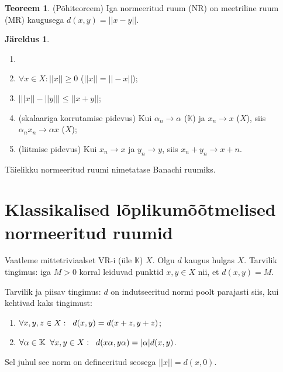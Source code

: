 \documentclass{article}[12pt]
\newcommand{\h}{\hspace{0.2cm}}
\newcommand{\K}{\mathbb{K}}
\newcommand{\norm}[1]{||#1||}
\theoremstyle{definition}
\theoremstyle{definition}
\newtheorem{theorem}{Teoreem}[section]
\theoremstyle{definition}
\newtheorem{jareldus}{Järeldus}[section]
\theoremstyle{break}
\begin{document}
\begin{theorem}
	(Põhiteoreem) Iga normeeritud ruum (NR) on meetriline ruum (MR) kaugusega $d(x,y) = ||x-y||$.
\end{theorem}

\begin{jareldus}
	\begin{enumerate}
		\item[]
		\item $\forall x\in X: \norm{x} \geq 0$ ($\norm{x} = \norm{-x}$);
		\item $\bigg\lvert \norm{x} - \norm{y} \bigg\rvert \leq \norm{x+y}$;
		\item (skalaariga korrutamise pidevus) Kui $\alpha_n\rightarrow \alpha$ ($\K$) ja $x_n\rightarrow x$ ($X$), siis $\alpha_n x_n\rightarrow \alpha x$ ($X$);
		\item (liitmise pidevus) Kui $x_n\rightarrow x$ ja $y_n\rightarrow y$, siis $x_n+y_n \rightarrow x+n$.
	\end{enumerate}
\end{jareldus}

Täielikku normeeritud ruumi nimetatase Banachi ruumiks.

\section{Klassikalised lõplikumõõtmelised normeeritud ruumid}

Vaatleme mittetriviaalset VR-i (üle $\K$) $X$. Olgu $d$ kaugus hulgas $X$.
Tarvilik tingimus: iga $M>0$ korral leiduvad punktid $x,y\in X$ nii, et $d(x,y) = M$.

Tarvilik ja piisav tingimus: $d$ on indutseeritud normi poolt parajasti siis, kui kehtivad kaks tingimust:
\begin{enumerate}
	\item $\forall x,y,z\in X :\h d(x,y) = d(x+z,y+z)$;
	\item $\forall \alpha\in \K \h\forall x,y\in X: \h d(x\alpha,y\alpha) = |\alpha|d(x,y)$.
\end{enumerate}
Sel juhul see norm on defineeritud seosega $\norm{x} = d(x,0)$.
\end{document}
